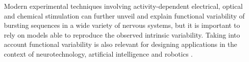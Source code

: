 Modern experimental techniques involving activity-dependent electrical, optical and chemical stimulation can further unveil and explain functional variability of bursting sequences in a wide variety of nervous systems, but it is important to rely on models able to reproduce the observed intrinsic variability. Taking into account functional variability is also relevant for designing applications in the context of neurotechnology, artificial intelligence and robotics \parencite{garrido-pena_exploring_2024}. 

%


